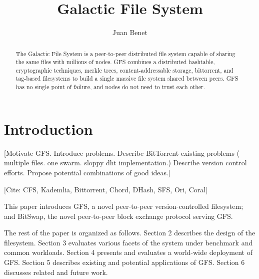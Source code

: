 \documentclass{sig-alternate}
\begin{document}

\title{Galactic File System}
\subtitle{}


\author{
%
%
\alignauthor
  Juan Benet\\
}

\maketitle
\begin{abstract}
The Galactic File System is a peer-to-peer distributed file system capable of
sharing the same files with millions of nodes. GFS combines a distributed
hashtable, cryptographic techniques, merkle trees, content-addressable
storage, bittorrent, and tag-based filesystems to build a single massive
file system shared between peers. GFS has no single point of failure, and
nodes do not need to trust each other.
\end{abstract}

\section{Introduction}

[Motivate GFS. Introduce problems. Describe BitTorrent existing problems (
multiple files. one swarm. sloppy dht implementation.) Describe version
control efforts. Propose potential combinations of good ideas.]

[Cite:
CFS,
Kademlia,
Bittorrent,
Chord,
DHash,
SFS,
Ori,
Coral]

This paper introduces
GFS, a novel peer-to-peer version-controlled filesystem;
and BitSwap, the novel peer-to-peer block exchange protocol serving GFS.

The rest of the paper is organized as follows.
Section 2 describes the design of the filesystem.
Section 3 evaluates various facets of the system under benchmark and common
workloads.
Section 4 presents and evaluates a world-wide deployment of GFS.
Section 5 describes existing and potential applications of GFS.
Section 6 discusses related and future work.
\end{document}
